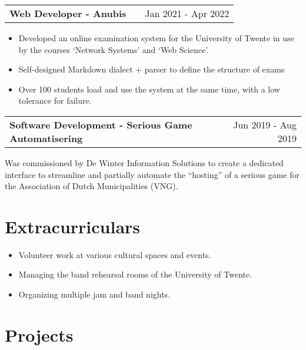 \documentclass[a4paper,12pt]{article}
\makeatletter
\newenvironment{jobshort}[2]
    {
    \begin{tabularx}{\linewidth}{@{}l X r@{}}
    \textbf{#1} & \hfill &  #2 \\[3.75pt]
    \end{tabularx}
    }
    {
    }
\newenvironment{joblong}[2]
    {
    \begin{tabularx}{\linewidth}{@{}l X r@{}}
    \textbf{#1} & \hfill &  #2 \\[3.75pt]
    \end{tabularx}
    \begin{minipage}[t]{\linewidth}
    \begin{itemize}[nosep,after=\strut, leftmargin=1em, itemsep=3pt,label=--]
    }
    {
    \end{itemize}
    \end{minipage}    
    }
\makeatother
\begin{document}
\begin{joblong}{Web Developer - Anubis}{Jan 2021 - Apr 2022}
\item Developed an online examination system for the University of Twente in use by the courses `Network Systems' and `Web Science'.
\item Self-designed Markdown dialect + parser to define the structure of exams 
\item Over 100 students load and use the system at the same time, with a low tolerance for failure. 
\end{joblong}

\begin{jobshort}{Software Development - Serious Game Automatisering}{Jun 2019 - Aug 2019}
Was commissioned by De Winter Information Solutions to create a dedicated interface to streamline and partially automate the ``hosting'' of a serious game for the Association of Dutch Municipalities (VNG).
\end{jobshort}

\section{Extracurriculars}
\begin{itemize}
    \item Volunteer work at various cultural spaces and events.
    \item Managing the band rehearsal rooms of the University of Twente.
    \item Organizing multiple jam and band nights.
\end{itemize}
  
\section{Projects}
\end{document}
